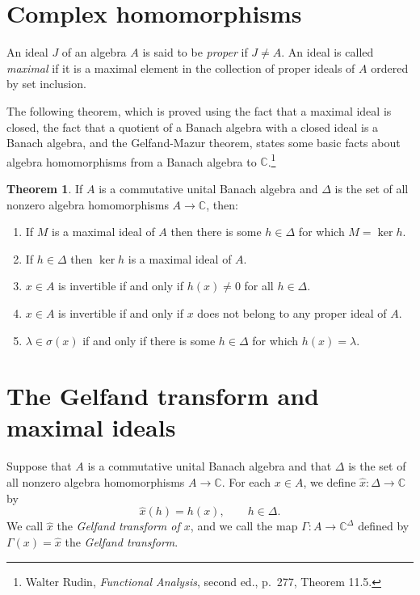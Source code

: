 \documentclass{article}
\theoremstyle{definition}
\newtheorem{theorem}{Theorem}
\theoremstyle{definition}
\begin{document}
\section{Complex homomorphisms}
An ideal $J$ of an algebra $A$ is said to be {\em proper} if $J \neq A$. An ideal is called {\em maximal} if it is a maximal element
in the collection of proper ideals of $A$ ordered by set inclusion.

The following theorem, which is proved using the fact  that a maximal
ideal is closed, the fact that a quotient of a Banach algebra with a closed ideal is a Banach algebra, and the Gelfand-Mazur theorem, states some basic facts about algebra
homomorphisms from a Banach algebra to $\mathbb{C}$.\footnote{Walter Rudin, {\em Functional Analysis}, second ed.,
p.~277, Theorem 11.5.}

\begin{theorem}
If $A$ is a commutative unital Banach algebra and $\Delta$ is the set of all nonzero
algebra homomorphisms $A \to \mathbb{C}$, then:
\begin{enumerate}
\item If $M$ is a maximal ideal of $A$ then there is some $h \in \Delta$ for which $M=\ker h$.
\item If $h \in \Delta$ then $\ker h$ is a maximal ideal of $A$.
\item $x \in A$ is invertible if and only if  $h(x) \neq 0$ for all $h \in \Delta$.
\item $x \in A$ is invertible if and only if $x$ does not belong to any proper ideal of $A$.
\item  $\lambda \in \sigma(x)$ if and only if there is some $h \in \Delta$ for which $h(x)=\lambda$.
\end{enumerate}
\label{homotheorem}
\end{theorem} 



\section{The Gelfand transform and maximal ideals}
Suppose that $A$ is a commutative unital Banach algebra and that $\Delta$ is the set of all nonzero algebra homomorphisms $A \to \mathbb{C}$. 
For each $x \in A$, we define $\hat{x}:\Delta \to \mathbb{C}$ by
\[
\hat{x}(h)=h(x), \qquad h \in \Delta.
\]
We call $\hat{x}$ the {\em Gelfand transform of $x$}, and
we call the map $\Gamma:A \to \mathbb{C}^\Delta$ defined by $\Gamma(x) = \hat{x}$ the {\em Gelfand transform}.
\end{document}
